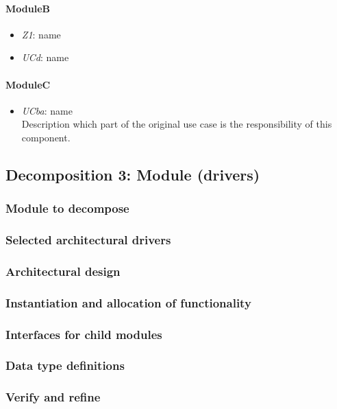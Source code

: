 \documentclass[a4paper,10pt]{article}
\begin{document}
\paragraph{ModuleB}
\begin{itemize}
	\item \emph{Z1}: name
	\item \emph{UCd}: name
\end{itemize}

\paragraph{ModuleC}
\begin{itemize}
	\item \emph{UCba}: name\\Description which part of the original use case is
	the responsibility of this component.
\end{itemize}

\subsection{Decomposition 3: Module (drivers)}
\subsubsection{Module to decompose}
\subsubsection{Selected architectural drivers}
\subsubsection{Architectural design}
\subsubsection{Instantiation and allocation of functionality}
\subsubsection{Interfaces for child modules}
\subsubsection{Data type definitions}
\subsubsection{Verify and refine}
\end{document}
